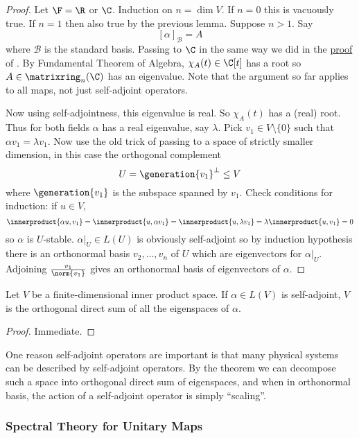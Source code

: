 \documentclass[a4paper]{article}
\newcommand*{\M}{\matrixring}
\newcommand*{\spans}{\generation}
\newcommand*{\basis}{\mathcal}
\newcommand*{\ip}{\innerproduct}
\theoremstyle{definition}
\begin{document}
\begin{proof}
  Let \(\F = \R\) or \(\C\). Induction on \(n = \dim V\). If \(n = 0\) this is vacuously true. If \(n = 1\) then also true by the previous lemma. Suppose \(n > 1\). Say
  \[
    [\alpha]_{\basis B} = A
  \]
  where \(\basis B\) is the standard basis. Passing to \(\C\) in the same way we did in the \hyperref[proof:determinant from characteristic]{proof} of . By Fundamental Theorem of Algebra, \(\chi_A(t) \in \C[t]\) has a root so \(A \in \M_n(\C)\) has an eigenvalue. Note that the argument so far applies to all maps, not just self-adjoint operators.

  Now using self-adjointness, this eigenvalue is real. So \(\chi_A(t)\) has a (real) root. Thus for both fields \(\alpha\) has a real eigenvalue, say \(\lambda\). Pick \(v_1 \in V \setminus \{0\}\) such that \(\alpha v_1 = \lambda v_1\). Now use the old trick of passing to a space of strictly smaller dimension, in this case the orthogonal complement
  \[
    U = \spans{v_1}^\perp \leq V
  \]
  where \(\spans{v_1}\) is the subspace spanned by \(v_1\). Check conditions for induction: if \(u \in V\),
  \[
    \ip{\alpha u, v_1} = \ip{u, \alpha v_1} = \ip{u, \lambda v_1} = \lambda \ip{u, v_1} = 0
  \]
  so \(\alpha\) is \(U\)-stable. \(\alpha|_U \in L(U)\) is obviously self-adjoint so by induction hypothesis there is an orthonormal basis \(v_2, \dots, v_n\) of \(U\) which are eigenvectors for \(\alpha|_U\). Adjoining \(\frac{v_1}{\norm{v_1}}\) gives an orthonormal basis of eigenvectors of \(\alpha\).
\end{proof}

\begin{corollary}
  Let \(V\) be a finite-dimensional inner product space. If \(\alpha \in L(V)\) is self-adjoint, \(V\) is the orthogonal direct sum of all the eigenspaces of \(\alpha\).
\end{corollary}

\begin{proof}
  Immediate.
\end{proof}

One reason self-adjoint operators are important is that many physical systems can be described by self-adjoint operators. By the theorem we can decompose such a space into orthogonal direct sum of eigenspaces, and when in orthonormal basis, the action of a self-adjoint operator is simply ``scaling''.

\subsubsection{Spectral Theory for Unitary Maps}
\end{document}
